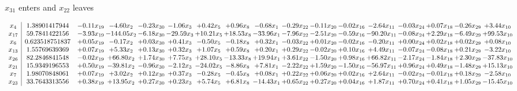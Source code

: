 \documentclass[9pt]{article}
\begin{document}
 $ x_{31} $ enters and $ x_{22} $ leaves 

 \[\begin{array}{c| c c@{\hskip 2pt} c@{\hskip 2pt} c@{\hskip 2pt} c@{\hskip 2pt} c@{\hskip 2pt} c@{\hskip 2pt} c@{\hskip 2pt} c@{\hskip 2pt} c@{\hskip 2pt} c@{\hskip 2pt} c@{\hskip 2pt} c@{\hskip 2pt} c@{\hskip 2pt} c@{\hskip 2pt} c@{\hskip 2pt} }
 x_{4}   &  1.38901417944 & -0.11 x_{19} & -4.60 x_{2} & -0.23 x_{30} & -1.06 x_{3} & +  0.42 x_{5} & +  0.96 x_{8} & -0.68 x_{1} & -0.29 x_{22} & -0.11 x_{20} & -0.02 x_{16} & -2.64 x_{11} & -0.03 x_{24} & +  0.07 x_{18} & -0.26 x_{29} & +  3.44 x_{10}\\
 x_{17}   &  59.7841422156 & -3.93 x_{19} & -144.05 x_{2} & -6.18 x_{30} & -29.59 x_{3} & + 10.21 x_{5} & + 18.53 x_{8} & -33.96 x_{1} & -7.96 x_{22} & -2.51 x_{20} & -0.59 x_{16} & -90.20 x_{11} & -0.08 x_{24} & +  2.29 x_{18} & -6.49 x_{29} & + 99.53 x_{10}\\
 x_{6}   &  0.623518751837 & +  0.05 x_{19} & -0.17 x_{2} & +  0.03 x_{30} & +  0.41 x_{3} & -0.50 x_{5} & -0.18 x_{8} & +  0.32 x_{1} & -0.03 x_{22} & +  0.01 x_{20} & -0.02 x_{16} & -0.20 x_{11} & +  0.00 x_{24} & +  0.02 x_{18} & +  0.02 x_{29} & +  0.08 x_{10}\\
 x_{13}   &  1.55769639369 & +  0.07 x_{19} & +  5.33 x_{2} & +  0.13 x_{30} & +  0.32 x_{3} & +  1.07 x_{5} & +  0.59 x_{8} & +  0.20 x_{1} & +  0.29 x_{22} & -0.02 x_{20} & +  0.10 x_{16} & +  4.49 x_{11} & -0.07 x_{24} & -0.08 x_{18} & +  0.21 x_{29} & -3.22 x_{10}\\
 x_{26}   &  82.2846841548 & -0.02 x_{19} & + 66.80 x_{2} & +  1.74 x_{30} & +  7.75 x_{3} & + 28.10 x_{5} & -13.33 x_{8} & + 19.94 x_{1} & +  3.61 x_{22} & -1.50 x_{20} & +  0.98 x_{16} & + 66.82 x_{11} & -2.17 x_{24} & -1.84 x_{18} & +  2.30 x_{29} & -37.83 x_{10}\\
 x_{21}   &  15.9349196553 & +  0.50 x_{19} & -39.81 x_{2} & -0.96 x_{30} & -2.12 x_{3} & -24.02 x_{5} & -8.86 x_{8} & +  7.81 x_{1} & -2.22 x_{22} & +  1.59 x_{20} & -1.50 x_{16} & -56.97 x_{11} & +  0.96 x_{24} & +  0.49 x_{18} & -1.48 x_{29} & + 15.13 x_{10}\\
 x_{7}   &  1.98070848061 & +  0.07 x_{19} & +  3.02 x_{2} & +  0.12 x_{30} & +  0.37 x_{3} & -0.28 x_{5} & -0.45 x_{8} & +  0.08 x_{1} & +  0.22 x_{22} & +  0.06 x_{20} & +  0.02 x_{16} & +  2.64 x_{11} & -0.02 x_{24} & -0.01 x_{18} & +  0.18 x_{29} & -2.58 x_{10}\\
 x_{23}   &  33.7643313556 & +  0.38 x_{19} & + 13.95 x_{2} & +  0.27 x_{30} & +  0.23 x_{3} & +  5.74 x_{5} & +  6.81 x_{8} & -14.43 x_{1} & +  0.65 x_{22} & +  0.27 x_{20} & +  0.04 x_{16} & +  1.87 x_{11} & +  0.70 x_{24} & +  0.41 x_{18} & +  1.05 x_{29} & -15.45 x_{10}\\

\end{array}\]
\end{document}
